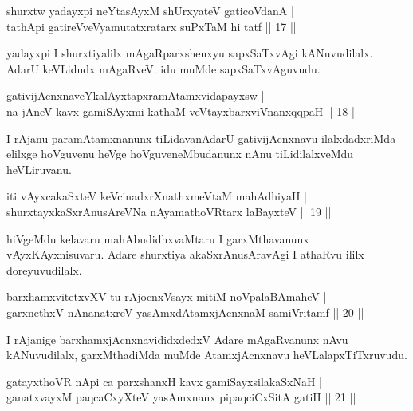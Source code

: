 \begin{shl}
shurxtw yadayxpi neYtasAyxM shUrxyateV gaticoVdanA |\\
tathA\s pi gatireVveVyamutatxratarx suPxTaM hi tatf \hfill || 17 || 
\end{shl}

\begin{artha}
yadayxpi I shurxtiyalilx mAgaRparxshenxyu sapxSaTxvAgi kANuvudilalx. AdarU keVLidudx mAgaRveV. idu muMde sapxSaTxvAguvudu.
\end{artha}

\begin{shl}
gativijAcnxnaveYkalAyxtapxramAtamxvidapayxsw |\\
na jAneV kavx gamiSAyxmi kathaM veVtayxbarxviVnanxqqpaH \hfill || 18 || 
\end{shl}

\begin{artha}
I rAjanu paramAtamxnanunx tiLidavanAdarU gativijAcnxnavu ilalxdadxriMda elilxge hoVguvenu heVge hoVguveneMbudanunx nAnu tiLidilalxveMdu heVLiruvanu.
\end{artha}


\begin{shl}
iti vAyxcakaSxteV keVcinadxrXnathxmeVtaM mahAdhiyaH |\\
shurxtayxkaSxrAnusAreVNa nAyamathoVR\s tarx laBayxteV \hfill || 19 || 
\end{shl}

\begin{artha}
hiVgeMdu kelavaru mahAbudidhxvaMtaru I garxMthavanunx vAyxKAyxnisuvaru. Adare shurxtiya akaSxrAnusAravAgi I athaRvu ililx doreyuvudilalx.
\end{artha}

\begin{shl}
barxhamxvitetxvXV tu rAjocnxV\s sayx mitiM noVpalaBAmaheV |\\
garxnethxV nAnanatxreV yasAmxdAtamxjAcnxnaM samiVritamf \hfill || 20 || 
\end{shl}

\begin{artha}
I rAjanige barxhamxjAcnxnavididxdedxV Adare mAgaRvanunx nAvu kANuvudilalx, garxMthadiMda muMde AtamxjAcnxnavu heVLalapxTiTxruvudu. 
\end{artha}

\begin{shl}
gatayxthoVR nApi ca parxshanxH kavx gamiSayxsilakaSxNaH |\\
ganatxvayxM paqcaCxyXteV yasAmxnanx pipaqciCxSitA gatiH \hfill || 21 || 
\end{shl}

